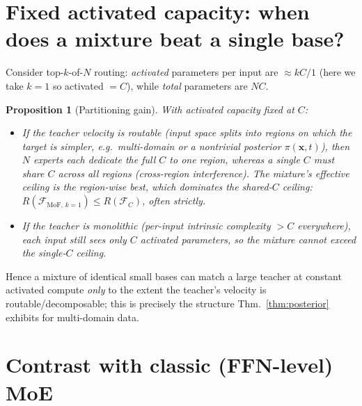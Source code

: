 \documentclass[11pt,a4paper]{article}
\newcommand{\Fc}{\mathcal{F}_C}
\newcommand{\xvec}{\bm{x}}
\newtheorem{proposition}{Proposition}
\begin{document}
\section{Fixed activated capacity: when does a mixture beat a single base?}

Consider top-$k$-of-$N$ routing: \emph{activated} parameters per input are $\approx kC/1$ (here we take
$k{=}1$ so activated $=C$), while \emph{total} parameters are $NC$.

\begin{proposition}[Partitioning gain]\label{prop:partition}
With activated capacity fixed at $C$:
\begin{itemize}[leftmargin=1.4em]
  \item If the teacher velocity is \emph{routable} (input space splits into regions on which the
  target is simpler, e.g.\ multi-domain or a nontrivial posterior $\pi(\xvec,t)$), then $N$ experts each
  dedicate the full $C$ to one region, whereas a single $C$ must \emph{share} $C$ across all regions
  (cross-region interference). The mixture's effective ceiling is the \emph{region-wise} best, which
  dominates the shared-$C$ ceiling: $R(\mathcal F_{\text{MoF},\,k{=}1})\le R(\Fc)$, often strictly.
  \item If the teacher is \emph{monolithic} (per-input intrinsic complexity $>C$ everywhere), each
  input still sees only $C$ activated parameters, so the mixture cannot exceed the single-$C$ ceiling.
\end{itemize}
\end{proposition}

\noindent Hence a mixture of identical small bases can match a large teacher at constant activated
compute \emph{only} to the extent the teacher's velocity is routable/decomposable; this is precisely
the structure Thm.~\ref{thm:posterior} exhibits for multi-domain data.

\section{Contrast with classic (FFN-level) MoE}

\begin{center}
\end{center}
\end{document}
